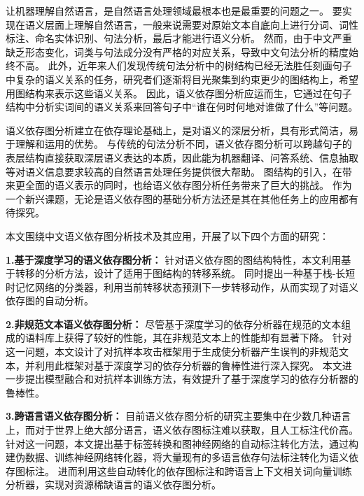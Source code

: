 \begin{cabstract}

让机器理解自然语言，是自然语言处理领域最根本也是最重要的问题之一。
要实现在语义层面上理解自然语言，一般来说需要对原始文本自底向上进行分词、词性标注、命名实体识别、句法分析，最后才能进行语义分析。
然而，由于中文严重缺乏形态变化，词类与句法成分没有严格的对应关系，导致中文句法分析的精度始终不高。
此外，近年来人们发现传统句法分析中的树结构已经无法胜任刻画句子中复杂的语义关系的任务，研究者们逐渐将目光聚集到约束更少的图结构上，希望用图结构来表示这些语义关系。
因此，语义依存图分析应运而生，它通过在句子结构中分析实词间的语义关系来回答句子中“谁在何时何地对谁做了什么”等问题。

语义依存图分析建立在依存理论基础上，是对语义的深层分析，具有形式简洁，易于理解和运用的优势。
与传统的句法分析不同，语义依存图分析可以跨越句子的表层结构直接获取深层语义表达的本质，因此能为机器翻译、问答系统、信息抽取等对语义信息要求较高的自然语言处理任务提供很大帮助。
图结构的引入，在带来更全面的语义表示的同时，也给语义依存图分析任务带来了巨大的挑战。
作为一个新兴课题，无论是语义依存图的基础分析方法还是其在其他任务上的应用都有待探究。

本文围绕中文语义依存图分析技术及其应用，开展了以下四个方面的研究：

\textbf{1.基于深度学习的语义依存图分析：}  
针对语义依存图的图结构特性，本文利用基于转移的分析方法，设计了适用于图结构的转移系统。
同时提出一种基于栈-长短时记忆网络的分类器，利用当前转移状态预测下一步转移动作，从而实现了对语义依存图的自动分析。

\textbf{2.非规范文本语义依存图分析：}
尽管基于深度学习的依存分析器在规范的文本组成的语料库上获得了较好的性能，其在非规范文本上的性能却有显著下降。
针对这一问题，本文设计了对抗样本攻击框架用于生成使分析器产生误判的非规范文本，并利用此框架对基于深度学习的依存分析器的鲁棒性进行深入探究。
本文进一步提出模型融合和对抗样本训练方法，有效提升了基于深度学习的依存分析器的鲁棒性。

\textbf{3.跨语言语义依存图分析：}
目前语义依存图分析的研究主要集中在少数几种语言上，而对于世界上绝大部分语言，语义依存图标注难以获取，且人工标注代价高。
针对这一问题，本文提出基于标签转换和图神经网络的自动标注转化方法，通过构建伪数据、训练神经网络转化器，将大量现有的多语言依存句法标注转化为语义依存图标注。
进而利用这些自动转化的依存图标注和跨语言上下文相关词向量训练分析器，实现对资源稀缺语言的语义依存图分析。


\end{cabstract}
